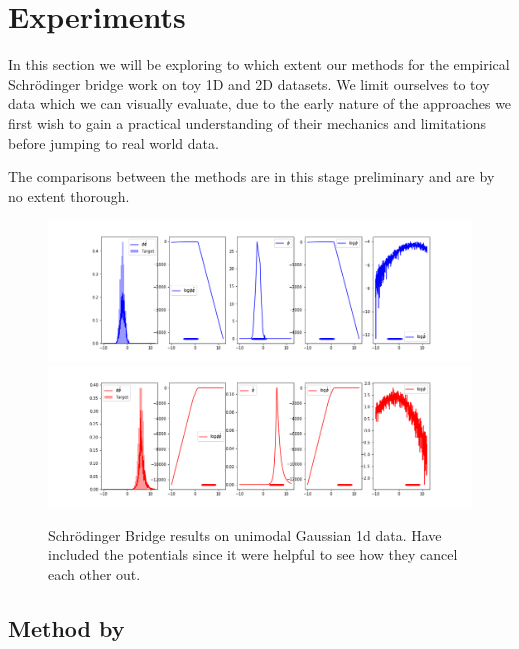 \documentclass[a4paper,12pt,twoside,openright]{report}
\theoremstyle{definition}
\begin{document}
\chapter{Experiments}

In this section we will be exploring to which extent our methods for the empirical Schrödinger bridge work on toy 1D and 2D datasets. We limit ourselves to toy data which we can visually evaluate, due to the early nature of the approaches we first wish to gain a practical understanding of their mechanics and limitations before jumping to real world data. 

The comparisons between the methods are in this stage preliminary and are by no extent thorough.
\begin{figure}[t]
    \centering
    \includegraphics[scale=0.42,trim={2.3cm 0.2cm 1.5cm 0}, clip]{images/Pavon/Forward_unimodal_working_pavon_relu_nn500.png}\\\vspace{-0.2cm}
    \includegraphics[scale=0.42,trim={2.3cm 0 1.5cm 1.5cm}, clip]{images/Pavon/Backward_unimodal_working_pavon_relu_nn500.png} 
    \caption{Schrödinger Bridge results on unimodal Gaussian 1d data. Have included the potentials since it  were helpful to see how they cancel each other out. }
    \label{fig:driftpavon}
\end{figure}
\section{Method by \cite{pavon2018data}}
\end{document}
